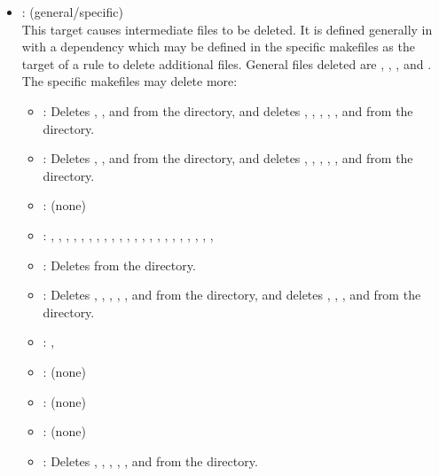 \begin{itemize}
\item
    : (general/specific)
   \\ This target causes intermediate files to be deleted.  It is defined
   generally in  with a dependency which may be defined in the
   specific makefiles as the target of a rule to delete additional files.
   General files deleted are \file{*~}, \file{*\%}, ,
   and .  The specific makefiles may delete more:
   \begin{itemize}
   \item
      : Deletes \file{*~}, \file{*\%}, and 
      from the  directory, and deletes ,
      , , , , and 
      from the  directory.
   \item
      : Deletes \file{*~}, \file{*\%}, and 
      from the  directory, and deletes ,
      , , , , and 
      from the  directory.
   \item
      : (none)
   \item
      : , , , ,
      , , , , ,
      , , , , ,
      , , , , ,
      , , , 
   \item
      : Deletes  from the  directory.
   \item
      : Deletes , , ,
      , , and  from the 
      directory, and deletes \file{*~}, \file{*\%}, , and
       from the  directory.
   \item
      : , 
   \item
      : (none)
   \item
      : (none)
   \item
      : (none)
   \item
      : Deletes , , , ,
      , and  from the  directory.
   \end{itemize}


\end{itemize}
